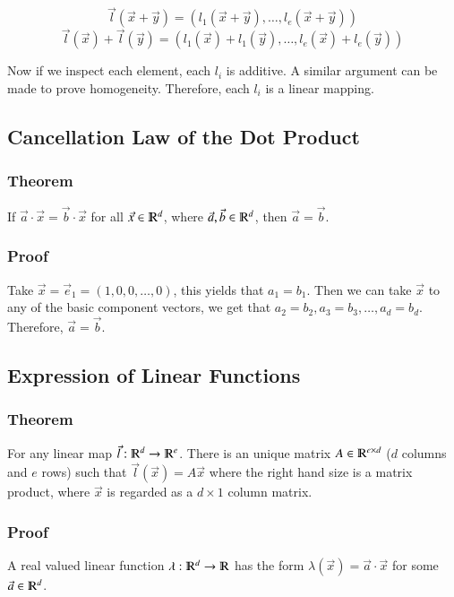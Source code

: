 \documentclass [12 pt, twoside] {book}
\newcommand\+{\text{ }}
\begin{document}
\[
    \vec{l}(\vec{x} + \vec{y}) = (l_1(\vec{x} + \vec{y}), \dots, l_e(\vec{x} +
    \vec{y}))
\]
\[
    \vec{l}(\vec{x}) + \vec{l}(\vec{y}) = (l_1(\vec{x}) + l_1(\vec{y}), \dots,
    l_e(\vec{x}) + l_e(\vec{y}))
\]

Now if we inspect each element, each $l_i$ is additive. A similar argument can
be made to prove homogeneity. Therefore, each $l_i$ is a linear mapping.

\subsection{Cancellation Law of the Dot Product}
\subsubsection{Theorem}

If $\vec{a} \cdot \vec{x} = \vec{b} \cdot \vec{x}$ for all $\vec{x} \in
\varmathbb{R}^d$, where $\vec{a}, \vec{b} \in \varmathbb{R}^d$, then $\vec{a} =
\vec{b}$.

\subsubsection{Proof}

Take $\vec{x} = \vec{e}_1 = (1, 0, 0, \dots, 0)$, this yields that $a_1 = b_1$.
Then we can take $\vec{x}$ to any of the basic component vectors, we get that
$a_2 = b_2, a_3 = b_3, \dots, a_d = b_d$. Therefore, $\vec{a} = \vec{b}$.

\subsection{Expression of Linear Functions}
\subsubsection{Theorem}
For any linear map $\vec{l}: \varmathbb{R}^d \to \varmathbb{R}^e$.
There is an unique matrix $A \in \varmathbb{R}^{e \times d}$ ($d$ columns and
$e$ rows) such that $\vec{l}(\vec{x}) = A\vec{x}$ where the right hand size is a
matrix product, where $\vec{x}$ is regarded as a $d \times 1$ column matrix.

\subsubsection{Proof}
A real valued linear function $\lambda : \varmathbb{R}^d \to \varmathbb{R}$ has
the form $\lambda(\vec{x}) = \vec{a} \cdot \vec{x}$ for some $\vec{a} \in
\varmathbb{R}^d$.
\end{document}
